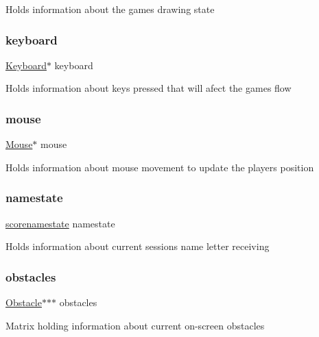 Holds information about the game\textquotesingle{}s drawing state \hypertarget{struct_game_a945ceeb6236fbaf00dcdb7a0109f0d40}{}\label{struct_game_a945ceeb6236fbaf00dcdb7a0109f0d40} 
\subsubsection{\texorpdfstring{keyboard}{keyboard}}
{\footnotesize\ttfamily \hyperlink{struct_keyboard}{Keyboard}$\ast$ keyboard}

Holds information about keys pressed that will afect the game\textquotesingle{}s flow \hypertarget{struct_game_a2514b83cbae6998a57eae74a24f6faf4}{}\label{struct_game_a2514b83cbae6998a57eae74a24f6faf4} 
\subsubsection{\texorpdfstring{mouse}{mouse}}
{\footnotesize\ttfamily \hyperlink{struct_mouse}{Mouse}$\ast$ mouse}

Holds information about mouse movement to update the player\textquotesingle{}s position \hypertarget{struct_game_a49bcb1da4ed10a863fee60550febc40a}{}\label{struct_game_a49bcb1da4ed10a863fee60550febc40a} 
\subsubsection{\texorpdfstring{namestate}{namestate}}
{\footnotesize\ttfamily \hyperlink{group__game_ga74f568c551e9db616e8fae5ed65be48d}{scorenamestate} namestate}

Holds information about current session\textquotesingle{}s name letter receiving \hypertarget{struct_game_ab4a2d4a1db034550f0e6755c8417f00e}{}\label{struct_game_ab4a2d4a1db034550f0e6755c8417f00e} 
\subsubsection{\texorpdfstring{obstacles}{obstacles}}
{\footnotesize\ttfamily \hyperlink{struct_obstacle}{Obstacle}$\ast$$\ast$$\ast$ obstacles}

Matrix holding information about current on-\/screen obstacles \hypertarget{struct_game_a96781128d3743da3d17e0fdd91afba7b}{}\label{struct_game_a96781128d3743da3d17e0fdd91afba7b} 
